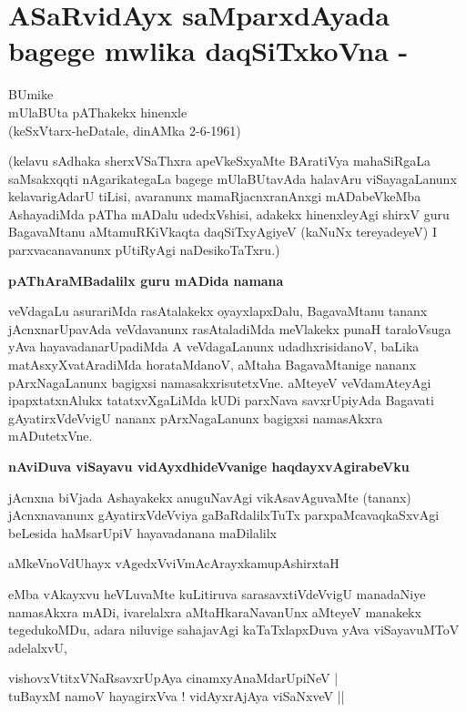 \chapter{ASaRvidAyx saMparxdAyada bagege mwlika daqSiTxkoVna - }

\begin{center}
BUmike\\[2pt]
mUlaBUta pAThakekx hinenxle\\[2pt]
(keSxVtarx-heDatale, dinAMka 2-6-1961)
\end{center}

\noindent
(kelavu sAdhaka sherxVSaThxra apeVkeSxyaMte BAratiVya mahaSiRgaLa saMsakxqqti nAgarikategaLa bagege mUlaBUtavAda halavAru viSayagaLanunx kelavarigAdarU tiLisi, avaranunx mamaRjacnxranAnxgi mADabeVkeMba AshayadiMda pATha mADalu udedxVshisi, adakekx hinenxleyAgi shirxV guru BagavaMtanu aMtamuRKiVkaqta daqSiTxyAgiyeV (kaNuNx tereyadeyeV) I parxvacanavanunx pUtiRyAgi naDesikoTaTxru.)


{\bigskip
\noindent
{\large\bf pAThAraMBadalilx guru mADida namana}}\label{page64}
\medskip

\noindent
veVdagaLu asurariMda rasAtalakekx oyayxlapxDalu, BagavaMtanu tananx jAcnxnarUpavAda veVdavanunx rasAtaladiMda meVlakekx punaH taraloVsuga yAva hayavadanarUpadiMda A veVdagaLanunx udadhxrisidanoV, baLika matAsxyXvatAradiMda horataMdanoV, aMtaha BagavaMtanige nananx pArxNagaLanunx bagigxsi namasakxrisutetxVne. aMteyeV veVdamAteyAgi ipapxtatxnAlukx tatatxvXgaLiMda kUDi parxNava savxrUpiyAda Bagavati gAyatirxVdeVvigU nananx pArxNagaLanunx bagigxsi namasAkxra mADutetxVne.

{\bigskip
\noindent
{\large\bf nAviDuva viSayavu vidAyxdhideVvanige haqdayxvAgirabeVku}}\label{page64a}
\medskip

\noindent
jAcnxna biVjada Ashayakekx anuguNavAgi vikAsavAguvaMte (tananx) jAcnxnavanunx gAyatirxVdeVviya gaBaRdalilxTuTx parxpaMcavaqkaSxvAgi beLesida haMsarUpiV hayavadanana maDilalilx

\begin{shloka}
aMkeVnoVdUhayx vAgedxVviVmAcArayxkamupAshirxtaH\label{page64b}
\end{shloka} 

\noindent
eMba vAkayxvu heVLuvaMte kuLitiruva sarasavxtiVdeVvigU manadaNiye namasAkxra mADi, ivarelalxra aMtaHkaraNavanUnx aMteyeV manakekx tegedukoMDu, adara niluvige sahajavAgi kaTaTxlapxDuva yAva viSayavuMToV adelalxvU, 

\begin{shloka}
vishovxVtitxVNaRsavxrUpAya cinamxyAnaMdarUpiNeV |\\\label{65}
tuBayxM namoV hayagirxVva ! vidAyxrAjAya viSaNxveV ||
\end{shloka}

